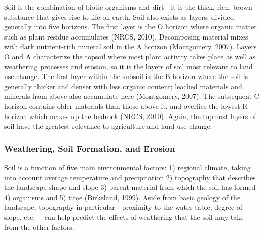\documentclass{book}\usepackage{knitr}
\begin{document}
\begin{knitrout}
\begin{kframe}
Soil is the combination of biotic organisms and dirt—it is the thick, rich, brown substance that gives rise to life on earth. Soil also exists as layers, divided generally into five horizons. The first layer is the O horizon where organic matter such as plant residue accumulates (NRCS, 2010). Decomposing material mixes with dark nutrient-rich mineral soil in the A horizon (Montgomery, 2007). Layers O and A characterize the topsoil where most plant activity takes place as well as weathering processes and erosion, so it is the layers of soil most relevant to land use change. The first layer within the subsoil is the B horizon where the soil is generally thicker and denser with less organic content; leached materials and minerals from above also accumulate here (Montgomery, 2007). The subsequent C horizon contains older materials than those above it, and overlies the lowest R horizon which makes up the bedrock (NRCS, 2010). Again, the topmost layers of soil have the greatest relevance to agriculture and land use change.

\subsubsection{Weathering, Soil Formation, and Erosion}

Soil is a function of five main environmental factors: 1) regional climate, taking into account average temperature and precipitation 2) topography that describes the landscape shape and slope 3) parent material from which the soil has formed 4) organisms and 5) time (Birkeland, 1999). Aside from basic geology of the landscape, topography in particular—proximity to the water table, degree of slope, etc.— can help predict the effects of weathering that the soil may take from the other factors.


\end{kframe}
\end{knitrout}
\end{document}
